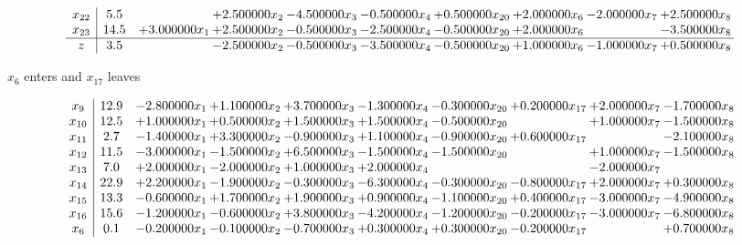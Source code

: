 \documentclass[10pt]{article}
\begin{document}
\[\begin{array}{c| c c@{\hskip 2pt} c@{\hskip 2pt} c@{\hskip 2pt} c@{\hskip 2pt} c@{\hskip 2pt} c@{\hskip 2pt} c@{\hskip 2pt} c@{\hskip 2pt} }
 x_{22}   &  5.5  &   & + 2.500000 x_{2} & -4.500000 x_{3} & -0.500000 x_{4} & + 0.500000 x_{20} & + 2.000000 x_{6} & -2.000000 x_{7} & + 2.500000 x_{8}\\
 x_{23}   &  14.5 & + 3.000000 x_{1} & + 2.500000 x_{2} & -0.500000 x_{3} & -2.500000 x_{4} & -0.500000 x_{20} & + 2.000000 x_{6} &   & -3.500000 x_{8}\\
\hline
z    &  3.5  &   & -2.500000 x_{2} & -0.500000 x_{3} & -3.500000 x_{4} & -0.500000 x_{20} & + 1.000000 x_{6} & -1.000000 x_{7} & + 0.500000 x_{8}\\
\end{array}\]


 $ x_{6} $ enters and $ x_{17} $ leaves 

 \[\begin{array}{c| c c@{\hskip 2pt} c@{\hskip 2pt} c@{\hskip 2pt} c@{\hskip 2pt} c@{\hskip 2pt} c@{\hskip 2pt} c@{\hskip 2pt} c@{\hskip 2pt} }
 x_{9}   &  12.9 & -2.800000 x_{1} & + 1.100000 x_{2} & + 3.700000 x_{3} & -1.300000 x_{4} & -0.300000 x_{20} & + 0.200000 x_{17} & + 2.000000 x_{7} & -1.700000 x_{8}\\
 x_{10}   &  12.5 & + 1.000000 x_{1} & + 0.500000 x_{2} & + 1.500000 x_{3} & + 1.500000 x_{4} & -0.500000 x_{20} &   & + 1.000000 x_{7} & -1.500000 x_{8}\\
 x_{11}   &  2.7 & -1.400000 x_{1} & + 3.300000 x_{2} & -0.900000 x_{3} & + 1.100000 x_{4} & -0.900000 x_{20} & + 0.600000 x_{17} &   & -2.100000 x_{8}\\
 x_{12}   &  11.5 & -3.000000 x_{1} & -1.500000 x_{2} & + 6.500000 x_{3} & -1.500000 x_{4} & -1.500000 x_{20} &   & + 1.000000 x_{7} & -1.500000 x_{8}\\
 x_{13}   &  7.0 & + 2.000000 x_{1} & -2.000000 x_{2} & + 1.000000 x_{3} & + 2.000000 x_{4} &    &   & -2.000000 x_{7} &   \\
 x_{14}   &  22.9 & + 2.200000 x_{1} & -1.900000 x_{2} & -0.300000 x_{3} & -6.300000 x_{4} & -0.300000 x_{20} & -0.800000 x_{17} & + 2.000000 x_{7} & + 0.300000 x_{8}\\
 x_{15}   &  13.3 & -0.600000 x_{1} & + 1.700000 x_{2} & + 1.900000 x_{3} & + 0.900000 x_{4} & -1.100000 x_{20} & + 0.400000 x_{17} & -3.000000 x_{7} & -4.900000 x_{8}\\
 x_{16}   &  15.6 & -1.200000 x_{1} & -0.600000 x_{2} & + 3.800000 x_{3} & -4.200000 x_{4} & -1.200000 x_{20} & -0.200000 x_{17} & -3.000000 x_{7} & -6.800000 x_{8}\\
 x_{6}   &  0.1 & -0.200000 x_{1} & -0.100000 x_{2} & -0.700000 x_{3} & + 0.300000 x_{4} & + 0.300000 x_{20} & -0.200000 x_{17} &   & + 0.700000 x_{8}\\

\end{array}\]
\end{document}
